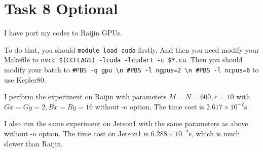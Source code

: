 \section{Task 8 Optional}

I have port my codes to Raijin GPUs.

To do that, you should \lstinline{module load cuda} firstly.
And then you need modify your Makefile to \lstinline{nvcc $(CCFLAGS) -lcuda -lcudart -c $*.cu}.
Then you should modify your batch to \lstinline{#PBS -q gpu \n #PBS -l ngpus=2 \n #PBS -l ncpus=6}
to use Kepler80.

I perform the experiment on Raijin with parameters $M=N=600, r=10$ with $Gx=Gy=2, Bx=By=16$ without -o option,
The time cost is $2.617\times 10^{-2}$s. 

I also run the same experiment on Jetson1 with the same parameters as above without -o option.
The time cost on Jetson1 is $6.288\times 10^{-2}$s, which is much slower than Raijin.
